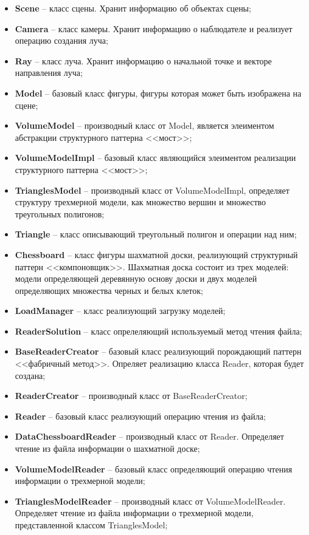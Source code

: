 \begin{itemize}
	\item \textbf{Scene} -- класс сцены. Хранит информацию об объектах сцены;
	\item \textbf{Camera} -- класс камеры. Хранит информацию о наблюдателе и реализует операцию создания луча;
	\item \textbf{Ray} -- класс луча. Хранит информацию о начальной точке и векторе направления луча;
	\item \textbf{Model} -- базовый класс фигуры, фигуры которая может быть изображена на сцене;
	\item \textbf{VolumeModel} -- производный класс от Model, является элеиментом абстракции структурного паттерна <<мост>>;
	\item \textbf{VolumeModelImpl} -- базовый класс являющийся элеиментом реализации структурного паттерна <<мост>>;
	\item \textbf{TrianglesModel} -- производный класс от VolumeModelImpl, определяет структуру трехмерной модели, как множество вершин и множество треугольных полигонов;
	\item \textbf{Triangle} -- класс описывающий треугольный полигон и операции над ним;
	\item \textbf{Chessboard} -- класс фигуры шахматной доски, реализующий структурный паттерн <<компоновщик>>. Шахматная доска состоит из трех моделей: модели определяющей деревянную основу доски и двух моделей определяющих множества черных и белых клеток;
	\item \textbf{LoadManager} -- класс реализующий загрузку моделей;
	\item \textbf{ReaderSolution} -- класс опрелеляющий используемый метод чтения файла;
	\item \textbf{BaseReaderCreator} -- базовый класс реализующий порождающий паттерн <<фабричный метод>>. Опреляет реализацию класса Reader, которая будет создана;
	\item \textbf{ReaderCreator} -- производный класс от BaseReaderCreator;
	\item \textbf{Reader} -- базовый класс реализующий операцию чтения из файла;
	\item \textbf{DataChessboardReader} -- производный класс от Reader. Определяет чтение из файла информации о шахматной доске;
	\item \textbf{VolumeModelReader} -- базовый класс определяющий операцию чтения информации о трехмерной модели;
	\item \textbf{TrianglesModelReader} -- производный класс от VolumeModelReader. Определяет чтение из файла информации о трехмерной модели, представленной классом TrianglesModel;

\end{itemize}
